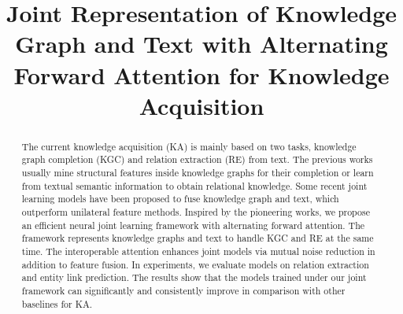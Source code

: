 \documentclass[letterpaper]{article} %
\begin{document}
%
\title{Joint Representation of Knowledge Graph and Text with Alternating Forward Attention for Knowledge Acquisition}
\maketitle
\begin{abstract}


The current knowledge acquisition (KA) is mainly based on two tasks, knowledge graph completion (KGC) and relation extraction (RE) from text. The previous works usually mine structural features inside knowledge graphs for their completion or learn from textual semantic information to obtain relational knowledge. Some recent joint learning models have been proposed to fuse knowledge graph and text, which outperform unilateral feature methods. Inspired by the pioneering works, we propose an efficient neural joint learning framework with alternating forward attention. The framework represents knowledge graphs and text to handle KGC and RE at the same time. The interoperable attention enhances joint models via mutual noise reduction in addition to feature fusion. In experiments, we evaluate models on relation extraction and entity link prediction. The results show that the models trained under our joint framework can significantly and consistently improve in comparison with other baselines for KA.

\end{abstract}

\end{document}

